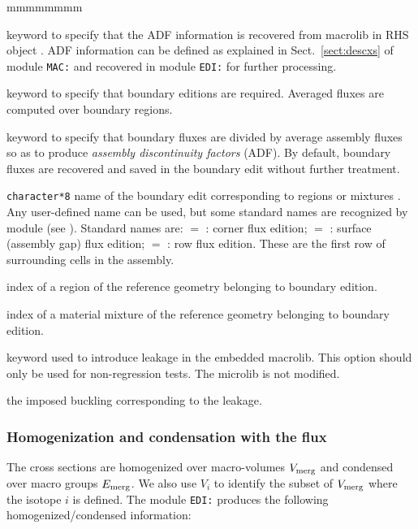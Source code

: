 \begin{ListeDeDescription}{mmmmmmmm}
\item[\moc{ADFM}] keyword to specify that the ADF information is recovered from macrolib in RHS object . ADF information can
be defined as explained in Sect.~\ref{sect:descxs} of module {\tt MAC:} and recovered in module {\tt EDI:} for further processing.

\item[\moc{ADF}] keyword to specify that boundary editions are required. Averaged fluxes are
computed over boundary regions.

\item[\moc{*}] keyword to specify that boundary fluxes are divided by average assembly fluxes so as to produce {\sl assembly discontinuity factors}
(ADF). By default, boundary fluxes are recovered and saved in the boundary edit without further treatment.

\item[\dusa{TYPE}] {\tt character*8} name of the boundary edit corresponding to
regions  or mixtures . Any user-defined name can be used, but some
standard names are recognized by module  (see ). Standard names are: $=$ :
corner flux edition; $=$ : surface (assembly gap) flux edition; $=$ :
row flux edition. These are the first row of surrounding cells in the assembly.

\item[\dusa{ireg}] index of a region of the reference geometry belonging to boundary edition.

\item[\dusa{imix}] index of a material mixture of the reference geometry belonging to boundary edition.

\item[\moc{LEAK}] keyword used to introduce leakage in the embedded {\sc macrolib}. This option should only be used for non-regression tests. The {\sc microlib} is not modified.

\item[\dusa{b2}] the imposed buckling corresponding to the leakage.

\end{ListeDeDescription}

\subsubsection{Homogenization and condensation with the flux}

The cross sections are homogenized over macro-volumes $V_{\rm merg}$ and condensed over
macro groups $E_{\rm merg}$. We also use $V_i$ to identify the subset of $V_{\rm merg}$ where
the isotope $i$ is defined. The module {\tt EDI:} produces the following homogenized/condensed information:

